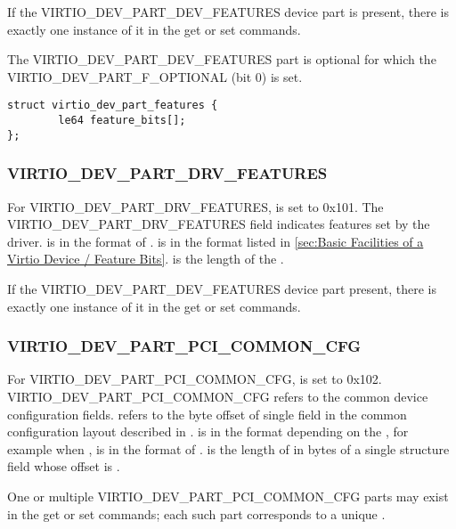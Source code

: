 If the VIRTIO_DEV_PART_DEV_FEATURES device part is present, there is exactly
one instance of it in the get or set commands.

The VIRTIO_DEV_PART_DEV_FEATURES part is optional for which
the VIRTIO_DEV_PART_F_OPTIONAL (bit 0)  is set.

\begin{lstlisting}
struct virtio_dev_part_features {
        le64 feature_bits[];
};
\end{lstlisting}

\subsubsection{VIRTIO_DEV_PART_DRV_FEATURES}
\label{sec:Basic Facilities of a Virtio Device / Device parts / Common device parts / VIRTIO-DEV-PART-DRV-FEATURES}

For VIRTIO_DEV_PART_DRV_FEATURES,  is set to 0x101.
The VIRTIO_DEV_PART_DRV_FEATURES field indicates features set by the driver.
 is in the format of .
 is in the format listed in
\ref{sec:Basic Facilities of a Virtio Device / Feature Bits}.
 is the length of the .

If the VIRTIO_DEV_PART_DEV_FEATURES device part present, there is exactly
one instance of it in the get or set commands.

\subsubsection{VIRTIO_DEV_PART_PCI_COMMON_CFG}
\label{sec:Basic Facilities of a Virtio Device / Device parts / Common device parts / VIRTIO-DEV-PART-PCI-COMMON-CFG}

For VIRTIO_DEV_PART_PCI_COMMON_CFG,  is set to 0x102.
VIRTIO_DEV_PART_PCI_COMMON_CFG refers to the common device configuration
fields.  refers to the
byte offset of single field in the common configuration layout described in
.  is in the format depending on
the , for example when , 
is in the format of .  is the length of
 in bytes of a single structure field whose offset is .

One or multiple VIRTIO_DEV_PART_PCI_COMMON_CFG parts may exist in the
get or set commands; each such part corresponds to a unique .

